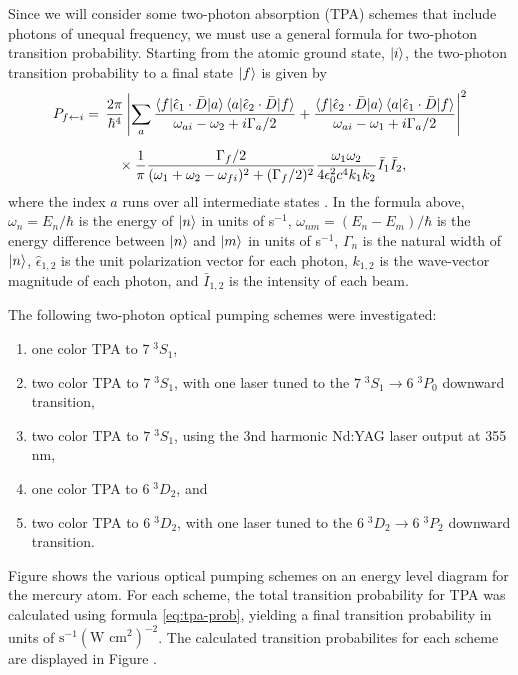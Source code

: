 \documentclass[12pt]{mitthesis}
\begin{document}
Since we will consider some two-photon absorption (TPA) schemes that
include photons of unequal frequency, we must use a general formula
for two-photon transition probability.  Starting from the atomic
ground state, $\mathinner{|{i}\rangle}$, the two-photon transition probability to a
final state $\mathinner{|{f}\rangle}$ is given by
\begin{equation}
  \label{eq:tpa-prob}
  \begin{split}
    P_{f \leftarrow i} = &\: \: \frac{2 \pi}{\hbar^4}
    \left \lvert
      \sum_a
      \frac{
        \mathinner{\langle{f|\hat{\epsilon}_1 \cdot \bar{D}|a}\rangle}\mathinner{\langle{a|\hat{\epsilon}_2 \cdot \bar{D}|f}\rangle}
      }{
        \omega_{ai} - \omega_2 + i \Gamma_a / 2
      } + \frac{
        \mathinner{\langle{f|\hat{\epsilon}_2 \cdot \bar{D}|a}\rangle}\mathinner{\langle{a|\hat{\epsilon}_1 \cdot \bar{D}|f}\rangle}
      }{
        \omega_{ai} - \omega_1 + i \Gamma_a / 2
      }
    \right \rvert ^2\\[2mm]
    & \: \: \: \: \: \: \times 
      \frac{1}{\pi} 
      \frac{
        \Gamma_f / 2
      }{
        (\omega_1 + \omega_2 - \omega_{fi})^2+(\Gamma_f/2)^2
      } \frac{
        \omega_1 \omega_2
      }{
        4 \epsilon_0^2 c^4 k_1 k_2
      } \bar{I}_1 \bar{I}_2,\\
  \end{split}
\end{equation}
where the index $a$ runs over all intermediate states \cite{bonin84,
  grynberg77}.  In the formula above, $\omega_n = E_n / \hbar$ is the
energy of $\mathinner{|{n}\rangle}$ in units of s$^{-1}$, $\omega_{nm} = (E_n -
E_m)/\hbar$ is the energy difference between $\mathinner{|{n}\rangle}$ and $\mathinner{|{m}\rangle}$
in units of s$^{-1}$, $\Gamma_n$ is the natural width of $\mathinner{|{n}\rangle}$,
$\hat{\epsilon}_{1,2}$ is the unit polarization vector for each
photon, $k_{1,2}$ is the wave-vector magnitude of each photon, and
$\bar{I}_{1,2}$ is the intensity of each beam.

The following two-photon optical pumping schemes were investigated: 
\renewcommand{\theenumi}{(\alph{enumi})}
\renewcommand{\labelenumi}{\theenumi}
\begin{enumerate}
  \item one color TPA to $7 \; ^3S_1$,
  \item two color TPA to $7 \; ^3S_1$, with one laser tuned to the
    $7 \; ^3S_1 \rightarrow 6 \; ^3P_0$ downward transition,
  \item two color TPA to $7 \; ^3S_1$, using the  3nd harmonic Nd:YAG
    laser output at 355 nm,
  \item one color TPA to $6 \; ^3D_2$, and
  \item two color TPA to $6 \; ^3D_2$, with one laser tuned to the
    $6 \; ^3D_2 \rightarrow 6 \; ^3P_2$ downward transition.
\end{enumerate}
Figure  shows the various optical pumping
schemes on an energy level diagram for the mercury atom.  For each
scheme, the total transition probability for TPA was calculated using
formula \ref{eq:tpa-prob}, yielding a final transition probability in
units of $\text{s}^{-1}(\text{W cm}^2)^{-2}$.  The calculated
transition probabilites for each scheme are displayed in Figure
.
\end{document}
